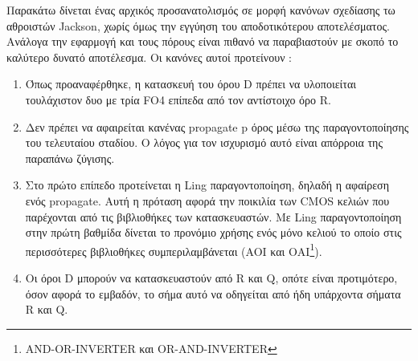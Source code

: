 Παρακάτω δίνεται ένας αρχικός προσανατολισμός σε μορφή κανόνων  σχεδίασης τω 
αθροιστών Jackson, χωρίς όμως την εγγύηση του αποδοτικότερου αποτελέσματος. 
Ανάλογα την εφαρμογή και τους πόρους είναι πιθανό να παραβιαστούν με σκοπό το καλύτερο 
δυνατό αποτέλεσμα. Οι κανόνες αυτοί προτείνουν :
\begin{enumerate}
    \item Όπως προαναφέρθηκε, η κατασκευή του όρου D πρέπει να υλοποιείται τουλάχιστον δυο με τρία FO4 επίπεδα από τον αντίστοιχο όρο R.
    \item Δεν πρέπει να αφαιρείται κανένας propagate p όρος μέσω της παραγοντοποίησης του τελευταίου
    σταδίου. Ο λόγος για τον ισχυρισμό αυτό είναι απόρροια της παραπάνω ζύγισης.
    \item Στο πρώτο επίπεδο προτείνεται η Ling παραγοντοποίηση, δηλαδή η αφαίρεση ενός 
    propagate. Αυτή η πρόταση αφορά την ποικιλία των CMOS κελιών που
    παρέχονται από τις βιβλιοθήκες των κατασκευαστών. Με Ling παραγοντοποίηση στην πρώτη 
    βαθμίδα δίνεται το προνόμιο χρήσης ενός μόνο κελιού το οποίο στις περισσότερες βιβλιοθήκες
    συμπεριλαμβάνεται (AOI και ΟΑΙ\footnote{AND-OR-INVERTER και OR-AND-INVERTER}).
    \item Οι όροι D μπορούν να κατασκευαστούν από R και Q, οπότε είναι προτιμότερο, όσον αφορά
    το εμβαδόν, το σήμα αυτό να οδηγείται από ήδη υπάρχοντα σήματα R και Q.
\end{enumerate}


































